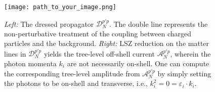 \documentclass{article}
\begin{document}
\begin{figure}[h]
    \centering
    \texttt{[image: path\_to\_your\_image.png]} %
    \caption{{\textit{Left:}} The dressed propagator $\mathcal{D}^{p'p}_{N}$. The double line represents the non-perturbative treatment of the coupling between charged particles and the background. 
             {\textit{Right:}} LSZ reduction on the matter lines in $\mathcal{D}^{p'p}_{N}$ yields the tree-level off-shell current $\mathcal{A}^{p'p}_{N}$, wherein the photon momenta $k_i$ are not necessarily on-shell. 
             One can compute the corresponding tree-level amplitude from $\mathcal{A}^{p'p}_{N}$ by simply setting the photons to be on-shell and transverse, i.e., $k_i^2 = 0 = \varepsilon_{i} \cdot k_{i}$.}
    \label{fig:dressed_propagator_and_current}
\end{figure}
\end{document}
